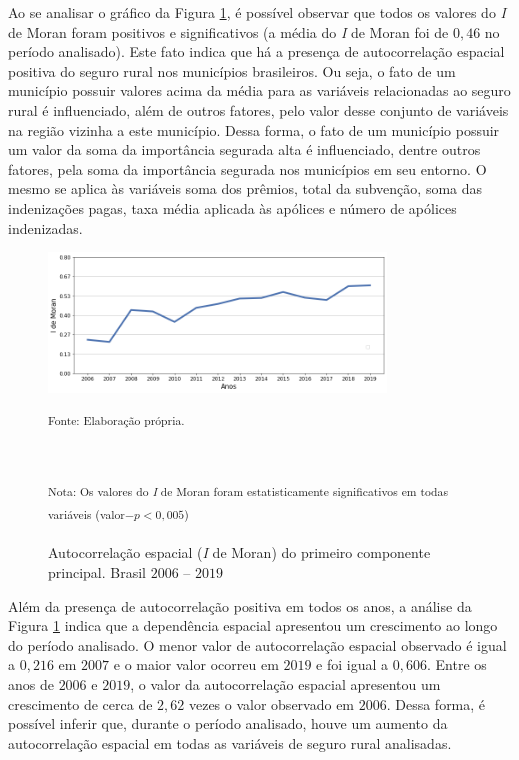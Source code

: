 Ao se analisar o gráfico da Figura \ref{i_moran_cp1}, é possível observar que todos os valores do \textit{I} de Moran foram positivos e significativos (a média do \textit{I} de Moran foi de $0,46$ no período analisado). Este fato indica que há a presença de autocorrelação espacial positiva do seguro rural nos municípios brasileiros. Ou seja, o fato de um município possuir valores acima da média para as variáveis relacionadas ao seguro rural é influenciado, além de outros fatores, pelo valor desse conjunto de variáveis na região vizinha a este município. Dessa forma, o fato de um município possuir um valor da soma da importância segurada alta é influenciado, dentre outros fatores, pela soma da importância segurada nos municípios em seu entorno. O mesmo se aplica às variáveis soma dos prêmios, total da subvenção, soma das indenizações pagas, taxa média aplicada às apólices e número de apólices indenizadas. 

\begin{figure}[H]
	\centering
	\caption{Autocorrelação espacial (\textit{I} de Moran) do primeiro componente principal. Brasil $2006$ -- $2019$}
	\includegraphics[width=0.8\textwidth]{figuras/i_de_moran_cp1.png}	\parbox{\dimexpr\linewidth-2cm}{\raggedright
    \strut \textsuperscript{Fonte: Elaboração própria.}\strut}\\
    \parbox{\dimexpr\linewidth-2.1cm}{\raggedright
    \strut \textsuperscript{Nota: Os valores do \textit{I} de Moran foram estatisticamente significativos em todas variáveis (valor$-p<0,005$)}\strut}
    \label{i_moran_cp1}
\end{figure}

Além da presença de autocorrelação positiva em todos os anos, a análise da Figura \ref{i_moran_cp1} indica que a dependência espacial apresentou um crescimento ao longo do período analisado. O menor valor de autocorrelação espacial observado é igual a $0,216$ em $2007$ e o maior valor ocorreu em $2019$ e foi igual a $0,606$. Entre os anos de $2006$ e $2019$, o valor da autocorrelação espacial apresentou um crescimento de cerca de $2,62$ vezes o valor observado em $2006$. Dessa forma, é possível inferir que, durante o período analisado, houve um aumento da autocorrelação espacial em todas as variáveis de seguro rural analisadas. 

